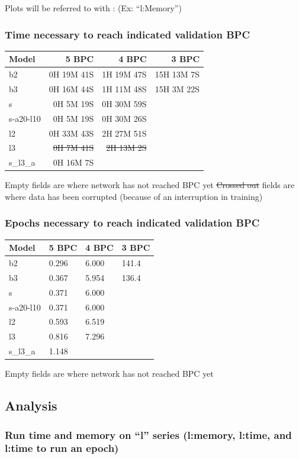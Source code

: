 Plots will be referred to with : (Ex: ``l:Memory'')

\subsubsection{Time necessary to reach indicated validation
BPC}\label{time-necessary-to-reach-indicated-validation-bpc}

\begin{longtable}[]{@{}lrrr@{}}
\toprule
Model & 5 BPC & 4 BPC & 3 BPC\tabularnewline
\midrule
\endhead
b2 & 0H 19M 41S & 1H 19M 47S & 15H 13M 7S\tabularnewline
b3 & 0H 16M 44S & 1H 11M 48S & 15H 3M 22S\tabularnewline
s & 0H 5M 19S & 0H 30M 59S &\tabularnewline
s-a20-l10 & 0H 5M 19S & 0H 30M 26S &\tabularnewline
l2 & 0H 33M 43S & 2H 27M 51S &\tabularnewline
l3 & \sout{0H 7M 41S} & \sout{2H 13M 2S} &\tabularnewline
s\_l3\_a & 0H 16M 7S & &\tabularnewline
\bottomrule
\end{longtable}

Empty fields are where network has not reached BPC yet \sout{Crossed
out} fields are where data has been corrupted (because of an
interruption in training)

\subsubsection{Epochs necessary to reach indicated validation
BPC}\label{epochs-necessary-to-reach-indicated-validation-bpc}

\begin{longtable}[]{@{}llll@{}}
\toprule
Model & 5 BPC & 4 BPC & 3 BPC\tabularnewline
\midrule
\endhead
b2 & 0.296 & 6.000 & 141.4\tabularnewline
b3 & 0.367 & 5.954 & 136.4\tabularnewline
s & 0.371 & 6.000 &\tabularnewline
s-a20-l10 & 0.371 & 6.000 &\tabularnewline
l2 & 0.593 & 6.519 &\tabularnewline
l3 & 0.816 & 7.296 &\tabularnewline
s\_l3\_a & 1.148 & &\tabularnewline
\bottomrule
\end{longtable}

Empty fields are where network has not reached BPC yet

\subsection{Analysis}\label{analysis}

\subsubsection{\texorpdfstring{Run time and memory on ``l'' series
(l:memory, l:time, and l:time to run an
epoch)}{Run time and memory on l series (l:memory, l:time, and l:time to run an epoch)}}\label{run-time-and-memory-on-l-series-lmemory-ltime-and-ltime-to-run-an-epoch}

